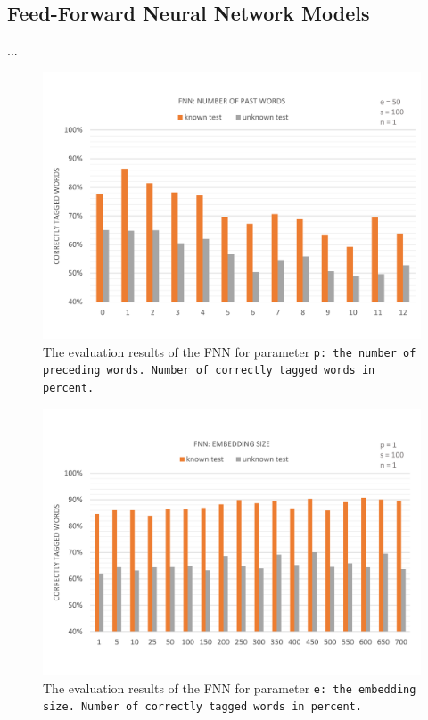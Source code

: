 \subsection{Feed-Forward Neural Network Models}\label{c.evaluation.results.fnn}
...

\begin{figure}[H]
	\includegraphics[width=\textwidth]{images/evaluation_fnn_p}
	\caption[FNN Evaluation: Number of Past Words]{The evaluation results of the FNN for parameter \tt{p}: the number of preceding words. Number of correctly tagged words in percent.}
	\label{f.evaluation.fnn.p}
\end{figure}

\begin{figure}[H]
	\includegraphics[width=\textwidth]{images/evaluation_fnn_e}
	\caption[FNN Evaluation: Number of Past Words]{The evaluation results of the FNN for parameter \tt{e}: the embedding size. Number of correctly tagged words in percent.}
	\label{f.evaluation.fnn.e}
\end{figure}

